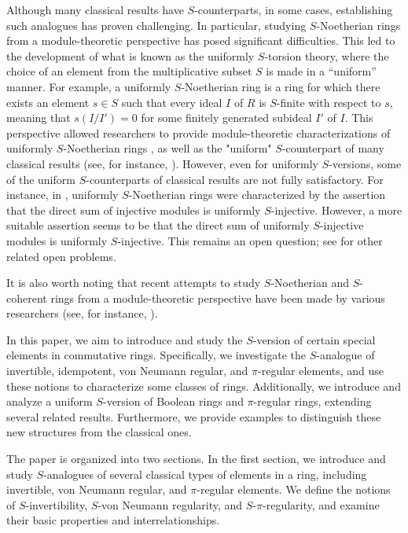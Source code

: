 \documentclass[12pt]{article}
\begin{document}
 Although many classical results have $S$-counterparts, in some cases, establishing such analogues has proven challenging. In particular, studying $S$-Noetherian rings from a module-theoretic perspective has posed significant difficulties.  This led to the development of what is known as the uniformly $S$-torsion theory, where the choice of an element from the multiplicative subset $S$ is made in a ``uniform'' manner. For example, a uniformly $S$-Noetherian ring is a ring for which there exists an element $s \in S$ such that every ideal $I$ of $R$ is $S$-finite with respect to $s$, meaning that $s(I/I') = 0$ for some finitely generated subideal $I'$ of $I$. This perspective allowed researchers to provide module-theoretic characterizations of uniformly $S$-Noetherian rings \cite{Min1}, as well as the "uniform" $S$-counterpart of many classical results (see, for instance, \cite{Zha4, Zha5, Zha6, Zha7, Zha8}).  However, even for uniformly $S$-versions, some of the uniform $S$-counterparts of classical results are not fully satisfactory. For instance, in \cite{Min1}, uniformly $S$-Noetherian rings were characterized by the assertion that the direct sum of injective modules is uniformly $S$-injective. However, a more suitable assertion seems to be that the direct sum of uniformly $S$-injective modules is uniformly $S$-injective. This remains an open question; see \cite{Bou6} for other related open problems. 
     
    It is also worth noting that recent attempts to study $S$-Noetherian and $S$-coherent rings from a module-theoretic perspective have been made by various researchers (see, for instance, \cite{Bou3, Bou4, Qi1, Zha1, Zha9}).


 In this paper, we aim to introduce and study the $S$-version of certain special elements in commutative rings. Specifically, we investigate the $S$-analogue of invertible, idempotent, von Neumann regular, and $\pi$-regular elements, and use these notions to characterize some classes of rings. Additionally, we introduce and analyze a uniform $S$-version of Boolean rings and $\pi$-regular rings, extending several related results. Furthermore, we provide examples to distinguish these new structures from the classical ones. 
 


 The paper is organized into two sections. In the first section, we introduce and study \( S \)-analogues of several classical types of elements in a ring, including invertible, von Neumann regular, and \(\pi\)-regular elements. We define the notions of \( S \)-invertibility, \( S \)-von Neumann regularity, and \( S \)-\(\pi\)-regularity, and examine their basic properties and interrelationships.
\end{document}
